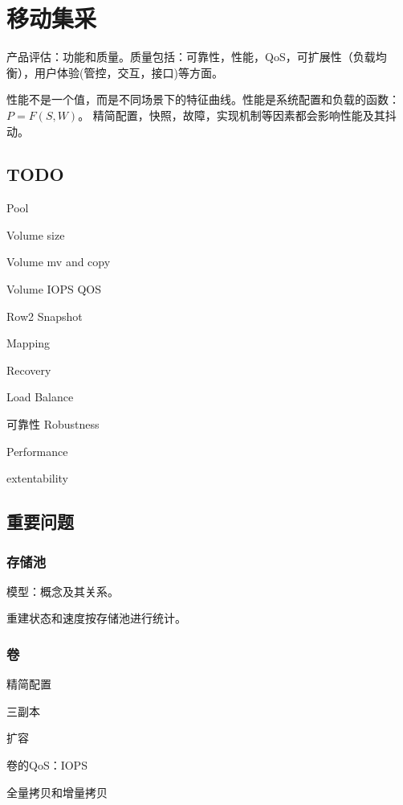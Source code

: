 \chapter{移动集采}

产品评估：功能和质量。质量包括：可靠性，性能，QoS，可扩展性（负载均衡），用户体验(管控，交互，接口)等方面。

性能不是一个值，而是不同场景下的特征曲线。性能是系统配置和负载的函数：$P=F(S, W)$。
精简配置，快照，故障，实现机制等因素都会影响性能及其抖动。

\section{TODO}

\begin{enumbox}
\item Pool
\item Volume size
\item Volume mv and copy
\item Volume IOPS QOS
\item Row2 Snapshot
\item Mapping
\item Recovery
\item Load Balance
\item 可靠性 Robustness
\item Performance
\item extentability
\end{enumbox}

\section{重要问题}

\subsection{存储池}

模型：概念及其关系。

重建状态和速度按存储池进行统计。

\subsection{卷}

\begin{enumbox}
    \item 精简配置
    \item 三副本
    \item 扩容
    \item 卷的QoS：IOPS
    \item 全量拷贝和增量拷贝
\end{enumbox}

